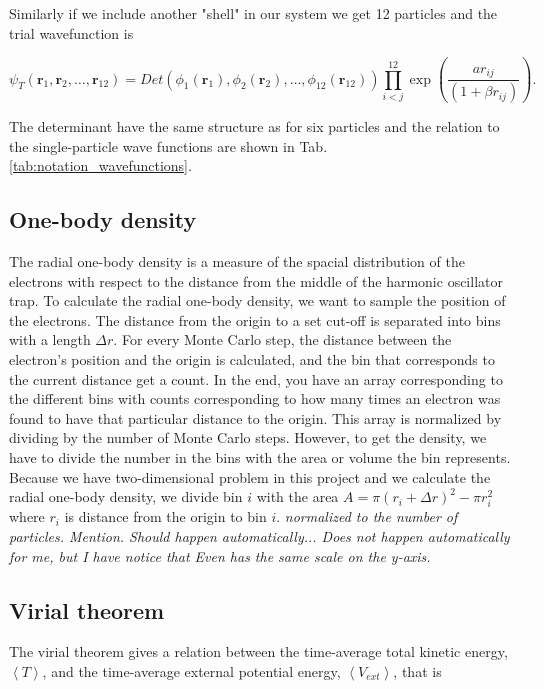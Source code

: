 Similarly if we include another "shell" in our system we get 12 particles and the trial wavefunction is 

\begin{equation}
   \psi_{T}(\bm{r}_1,\bm{r}_2, \dots,\bm{r}_{12}) = 
   Det\left(\phi_{1}(\bm{r}_1),\phi_{2}(\bm{r}_2),
   \dots,\phi_{12}(\bm{r}_{12})\right)
   \prod_{i<j}^{12}\exp{\left(\frac{ar_{ij}}{(1+\beta r_{ij})}\right)}.
\end{equation}

The determinant have the same structure as for six particles and the relation to the single-particle wave functions are shown in Tab. \ref{tab:notation_wavefunctions}.

\subsection{One-body density}

The radial one-body density is a measure of the spacial distribution of the electrons with respect to the distance from the middle of the harmonic oscillator trap. To calculate the radial one-body density, we want to sample the position of the electrons. The distance from the origin to a set cut-off is separated into bins with a length $\Delta r$. For every Monte Carlo step, the distance between the electron's position and the origin is calculated, and the bin that corresponds to the current distance get a count. In the end, you have an array corresponding to the different bins with counts corresponding to how many times an electron was found to have that particular distance to the origin. This array is normalized by dividing by the number of Monte Carlo steps. However, to get the density, we have to divide the number in the bins with the area or volume the bin represents. Because we have two-dimensional problem in this project and we calculate the radial one-body density, we divide bin $i$ with the area $ A = \pi (r_i+\Delta r)^2 - \pi r_i^2$ where $r_i$ is distance from the origin to bin $i$. \textit{normalized to the number of particles. Mention. Should happen automatically... Does not happen automatically for me, but I have notice that Even has the same scale on the y-axis.}\cite{Evens_master}

\subsection{Virial theorem}

The virial theorem gives a relation between the time-average total kinetic energy, $\left<T\right>$, and the time-average external potential energy, $\left<V_{ext}\right>$, that is


